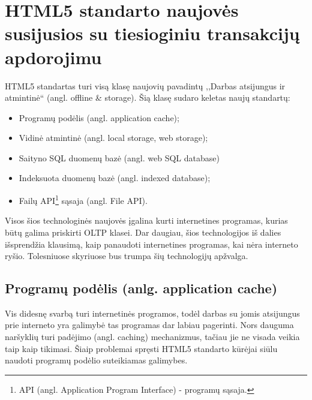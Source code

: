 \documentclass[12pt,a4paper,titlepage]{article}
\begin{document}
\section{HTML5 standarto naujovės susijusios su tiesioginiu transakcijų apdorojimu}

HTML5 standartas turi visą klasę naujovių pavadintų ,,Darbas atsijungus ir atmintinė`` (angl. offline \& storage). Šią klasę sudaro keletas naujų standartų: 
\begin{itemize}
  \item Programų podėlis (angl. application cache);
  \item Vidinė atmintinė (angl. local storage, web storage);
  \item Saityno SQL duomenų bazė (angl. web SQL database)
  \item Indeksuota duomenų bazė (angl. indexed database);
  \item Failų API\footnote{API (angl. Application Program Interface) - programų sąsaja.} sąsaja (angl. File API).
\end{itemize}
Visos šios technologinės naujovės įgalina kurti internetines programas, kurias būtų galima priskirti OLTP klasei. Dar daugiau, šios technologijos iš dalies išsprendžia klausimą, kaip panaudoti internetines programas, kai nėra interneto ryšio. Tolesniuose skyriuose bus trumpa šių technologijų apžvalga.

\subsection{Programų podėlis (anlg. application cache)}

Vis didesnę svarbą turi internetinės programos, todėl darbas su jomis atsijungus prie interneto yra galimybė tas programas dar labiau pagerinti. Nors dauguma naršyklių turi padėjimo (angl. caching) mechanizmus, tačiau jie ne visada veikia taip kaip tikimasi. Šiaip problemai spręsti HTML5 standarto kūrėjai siūlu naudoti programų podėlio suteikiamas galimybes. 
\end{document}
